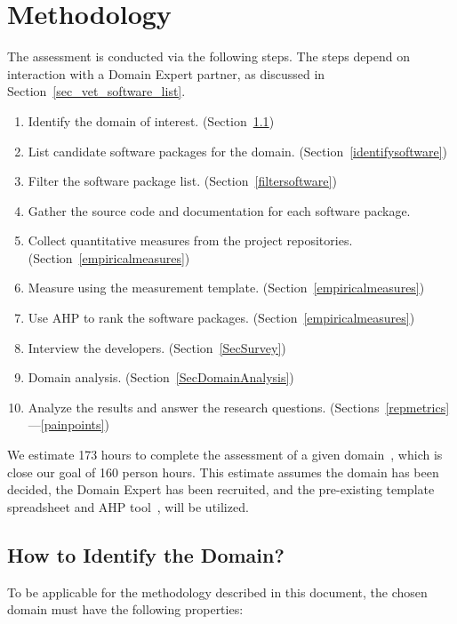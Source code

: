 \documentclass[runningheads]{llncs}
\begin{document}
\section{Methodology} \label{methodology}

The assessment is conducted via the following steps.  The steps depend on
interaction with a Domain Expert partner, as discussed in
Section~\ref{sec_vet_software_list}.

\begin{enumerate}
  \item Identify the domain of interest. (Section~\ref{SecIdentifyDomain})
	\item List candidate software packages for the domain.
	(Section~\ref{identifysoftware})
	\item Filter the software package list. (Section~\ref{filtersoftware})
	\item Gather the source code and documentation for each software package.
	\item Collect quantitative measures from the project repositories.
	(Section~\ref{empiricalmeasures})
	\item Measure using the measurement template. (Section~\ref{empiricalmeasures})
	\item Use AHP to rank the software packages. (Section~\ref{empiricalmeasures})
	\item Interview the developers. (Section~\ref{SecSurvey})
    \item Domain analysis. (Section~\ref{SecDomainAnalysis})
	\item Analyze the results and answer the research questions. (Sections~\ref{repmetrics}---\ref{painpoints}) %
\end{enumerate}

We estimate 173 hours to complete the assessment of a given
domain~\cite{SmithEtAl2021}, which is close our goal of 160 person hours. This
estimate assumes the domain has been decided, the Domain Expert has been
recruited, and the pre-existing template spreadsheet and AHP
tool~\cite{SmithEtAl2021}, will be utilized.

\subsection{How to Identify the Domain?} \label{SecIdentifyDomain} 

To be applicable for the methodology described in this document, the chosen
domain must have the following properties:
\end{document}
